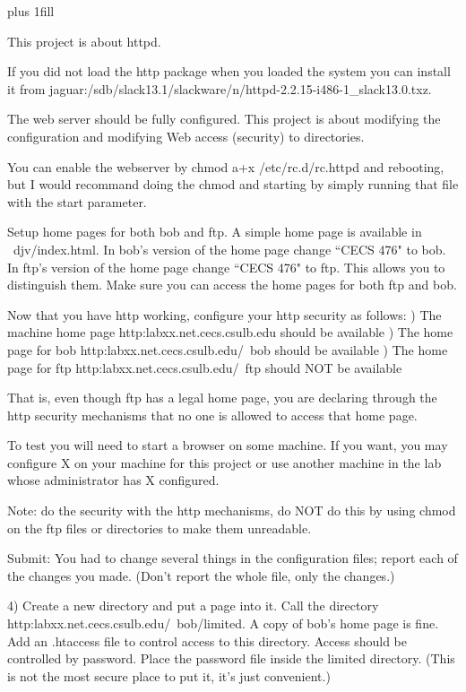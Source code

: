 
\rightskip=0pt plus 1fill

\parindent 0pt

This project is about httpd.

If you did not load the http package when you loaded the system you can
install it from
{\ltt{}jaguar:/sdb/slack13.1/slackware/n/httpd-2.2.15-i486-1_slack13.0.txz}.

The web server should be fully configured.
This project is about modifying the configuration and
modifying Web access (security) to directories.

You can enable the webserver by 
{\ltt{}chmod a+x /etc/rc.d/rc.httpd}
and rebooting,
but I would recommand doing the {\ltt{}chmod} and starting by simply
running that file with the {\ltt{}start} parameter.

Setup home pages for both bob and ftp.
A simple home page is available in {\ltt{}~djv/index.html}.
In bob's version of the home page change ``CECS 476" to bob.
In ftp's version of the home page change ``CECS 476" to ftp.
This allows you to distinguish them.
Make sure you can access the home pages for both ftp and bob.

Now that you have http working,
configure your http security as follows:
\hfill{}) The machine home page {\ltt{}http:labxx.net.cecs.csulb.edu}
should be available
\hfill{}) The home page for bob {\ltt{}http:labxx.net.cecs.csulb.edu/~bob}
should be available
\hfill{}) The home page for ftp {\ltt{}http:labxx.net.cecs.csulb.edu/~ftp}
should NOT be available

That is, even though ftp has a legal home page, you are declaring
through the http security mechanisms that no one is allowed to
access that home page.

To test you will need to start a browser on some machine. 
If you want, you may configure X on your machine for this project or use 
another machine in the lab whose administrator has X configured.

Note: do the security with the http mechanisms, do NOT do
this by using
{\ltt{}chmod} on the ftp files or directories to make them unreadable.

Submit: 
You had to change several things in the configuration files;
report each of the changes you made.
(Don't report the whole file, only the changes.)

4) Create a new directory and put a page into it.
Call the directory
{\ltt{}http:labxx.net.cecs.csulb.edu/~bob/limited}.
A copy of bob's home page is fine.
Add an {\ltt{}.htaccess} file to control access to this directory.
Access should be controlled by password.
Place the password file inside the {\ltt{}limited} directory.
(This is not the most secure place to put it, it's just convenient.)

